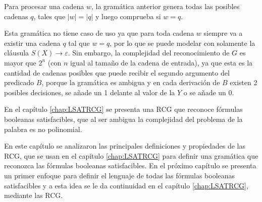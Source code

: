 \documentclass[12pt]{article}
\begin{document}
Para procesar una cadena $w$, la gramática anterior genera todas las posibles cadenas $q$, tales que $|w|=|q|$ y luego comprueba si $w = q$.

Esta gramática no tiene caso de uso ya que para toda cadena $w$ siempre va a existir una cadena $q$ tal que $w=q$, 
por lo que se puede modelar con solamente la cláusula $S(X)\to \varepsilon$. Sin embargo, la complejidad del 
reconocimiento de $G$ es mayor que $2^n$ (con $n$ igual al tamaño de la cadena de entrada), ya que esta es la 
cantidad de cadenas posibles que puede recibir el segundo argumento del predicado $B$, porque la gramática es 
ambigua y en cada derivación de $B$ existen 2 posibles decisiones, se añade un 1 delante al valor de la $Y$ o 
se añade un $0$.

En el capítulo \ref{chap:LSATRCG} se presenta una RCG que reconoce fórmulas booleanas satisfacibles, que al ser ambigua la complejidad del problema de la palabra es no polinomial.

En este capítulo se analizaron las principales definiciones y propiedades de las RCG, que se usan en el capítulo \ref{chap:LSATRCG} para definir una gramática que reconozca las fórmulas booleanas satisfacibles.  En el próximo capítulo se presenta un primer enfoque para definir el lenguaje de todas las fórmulas booleanas satisfacibles y a esta idea se le da continuidad en el capítulo \ref{chap:LSATRCG}, mediante las RCG.
\end{document}
